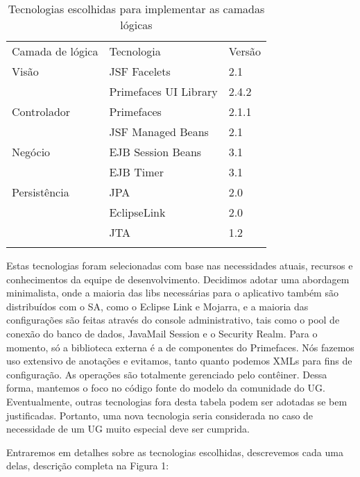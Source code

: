 \documentclass[envcountsame,envcountchap,letterpaper]{svmono}
\begin{document}
\begin{table}
\centering
\caption{Tecnologias escolhidas para implementar as camadas lógicas}
\label{tab:chosen-technologies}
\begin{tabular}{lll}
\hline\noalign{\smallskip}
Camada de lógica & Tecnologia & Versão \\
\noalign{\smallskip}\hline\noalign{\smallskip}
Visão & JSF Facelets & 2.1 \\
 & Primefaces UI Library & 2.4.2 \\
\noalign{\smallskip}
Controlador & Primefaces & 2.1.1 \\
 & JSF Managed Beans & 2.1 \\
\noalign{\smallskip}
Negócio & EJB Session Beans & 3.1 \\
 & EJB Timer & 3.1 \\
\noalign{\smallskip}
Persistência & JPA & 2.0 \\
 & EclipseLink & 2.0 \\
 & JTA & 1.2 \\
\noalign{\smallskip}\hline
\end{tabular}
\end{table}

Estas tecnologias foram selecionadas com base nas necessidades atuais, recursos e conhecimentos da equipe de desenvolvimento. Decidimos adotar uma abordagem minimalista, onde a maioria das libs necessárias para o aplicativo também são distribuídos com o SA, como o Eclipse Link e Mojarra, e a maioria das configurações são feitas através do console administrativo, tais como o pool de conexão do banco de dados, JavaMail Session e o Security Realm. Para o momento, só a biblioteca externa é a de componentes do Primefaces. Nós fazemos uso extensivo de anotações e evitamos, tanto quanto podemos XMLs para fins de configuração. As operações são totalmente gerenciado pelo contêiner. Dessa forma, mantemos o foco no código fonte do modelo da comunidade do UG. Eventualmente, outras tecnologias fora desta tabela podem ser adotadas se bem justificadas. Portanto, uma nova tecnologia seria considerada no caso de necessidade de um UG muito especial deve ser cumprida.

Entraremos em detalhes sobre as tecnologias escolhidas, descrevemos cada uma delas, descrição completa na Figura 1:
\end{document}
